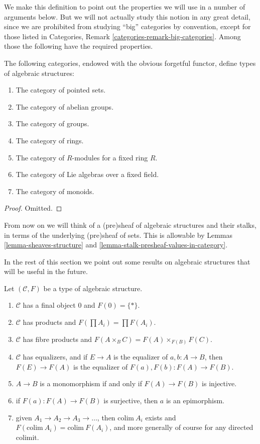 \noindent
We make this definition to point out the properties
we will use in a number of arguments below.  But we will
not actually study this notion in any great detail, since we
are prohibited from studying ``big'' categories by convention,
except for those listed in
Categories, Remark \ref{categories-remark-big-categories}.
Among those the following have the required properties.

\begin{lemma}
\label{lemma-list-algebraic-structures}
The following categories, endowed with the obvious forgetful
functor, define types of algebraic structures:
\begin{enumerate}
\item The category of pointed sets.
\item The category of abelian groups.
\item The category of groups.
\item The category of rings.
\item The category of $R$-modules for a fixed ring $R$.
\item The category of Lie algebras over a fixed field.
\item The category of monoids.
\end{enumerate}
\end{lemma}

\begin{proof}
Omitted.
\end{proof}

\noindent
From now on we will think of a (pre)sheaf of algebraic structures
and their stalks, in terms of the underlying (pre)sheaf of sets.
This is allowable by Lemmas \ref{lemma-sheaves-structure} and
\ref{lemma-stalk-presheaf-values-in-category}.

\medskip\noindent
In the rest of this section we point out some results
on algebraic structures that will be useful in the future.

\begin{lemma}
\label{lemma-properties-algebraic-structures}
Let $(\mathcal{C}, F)$ be a type of algebraic structure.
\begin{enumerate}
\item $\mathcal{C}$ has a final object $0$ and $F(0) = \{ * \}$.
\item $\mathcal{C}$ has products and $F(\prod A_i) = \prod F(A_i)$.
\item $\mathcal{C}$ has fibre products and
$F(A\times_BC) = F(A)\times_{F(B)}F(C)$.
\item $\mathcal{C}$ has equalizers, and if $E \to A$
is the equalizer of $a, b : A \to B$, then
$F(E) \to F(A)$ is the equalizer of $F(a), F(b) : F(A) \to F(B)$.
\item $A \to B$ is a monomorphism if and only if 
$F(A) \to F(B)$ is injective.
\item if $F(a) : F(A) \to F(B)$ is surjective, then
$a$ is an epimorphism.
\item given $A_1 \to A_2 \to A_3 \to \ldots$, then
$\text{colim}\ A_i$ exists and $F(\text{colim}\ A_i)=\text{colim}\ F(A_i)$,
and more generally of course for any directed colimit.
\end{enumerate}
\end{lemma}

